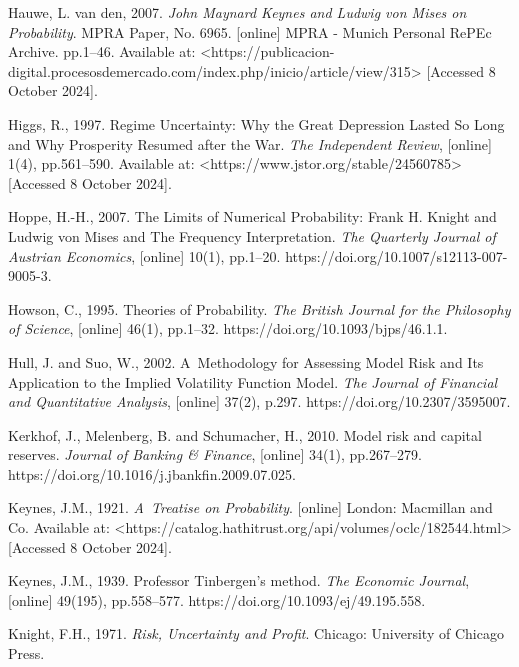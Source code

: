 Hauwe, L. van den, 2007. \textit{John Maynard Keynes and Ludwig von Mises on Probability}. MPRA Paper, No. 6965. [online] MPRA - Munich Personal RePEc Archive. pp.1–46. Available at: {\textless}https://publicacion-digital.procesosdemercado.com/index.php/inicio/article/view/315{\textgreater} [Accessed 8 October 2024].



Higgs, R., 1997. Regime Uncertainty: Why the Great Depression Lasted So Long and Why Prosperity Resumed after the War. \textit{The Independent Review}, [online] 1(4), pp.561–590. Available at: {\textless}https://www.jstor.org/stable/24560785{\textgreater} [Accessed 8 October 2024].



Hoppe, H.-H., 2007. The Limits of Numerical Probability: Frank H. Knight and Ludwig von Mises and The Frequency Interpretation. \textit{The Quarterly Journal of Austrian Economics}, [online] 10(1), pp.1–20. https://doi.org/10.1007/s12113-007-9005-3.



Howson, C., 1995. Theories of Probability. \textit{The British Journal for the Philosophy of Science}, [online] 46(1), pp.1–32. https://doi.org/10.1093/bjps/46.1.1.



Hull, J. and Suo, W., 2002. A~Methodology for Assessing Model Risk and Its Application to the Implied Volatility Function Model. \textit{The Journal of Financial and Quantitative Analysis}, [online] 37(2), p.297. https://doi.org/10.2307/3595007.



Kerkhof, J., Melenberg, B. and Schumacher, H., 2010. Model risk and capital reserves. \textit{Journal of Banking \& Finance}, [online] 34(1), pp.267–279. https://doi.org/10.1016/j.jbankfin.2009.07.025.



Keynes, J.M., 1921. \textit{A~Treatise on Probability}. [online] London: Macmillan and Co. Available at: {\textless}https://catalog.hathitrust.org/api/volumes/oclc/182544.html{\textgreater} [Accessed 8 October 2024].



Keynes, J.M., 1939. Professor Tinbergen's method. \textit{The Economic Journal}, [online] 49(195), pp.558–577. https://doi.org/10.1093/ej/49.195.558.



Knight, F.H., 1971. \textit{Risk, Uncertainty and Profit}. Chicago: University of Chicago Press.



